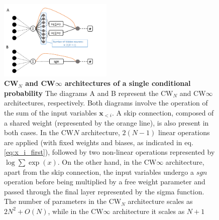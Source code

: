 \documentclass[aps,physrev,10pt,floatfix,reprint]{revtex4-2}
\begin{document}
\begin{figure}[!h]
    \centering 
    \includegraphics[width=0.48\textwidth]{img/CW_arch.pdf}
    \caption{\textbf{CW$_N$ and CW$\infty$ architectures of a single conditional probability} The diagrams A and B represent the CW$_N$ and CW$\infty$ architectures, respectively. Both diagrams involve the operation of the sum of the input variables $\mathbf{x}_{<i}$. A skip connection, composed of a shared weight (represented by the orange line), is also present in both cases. In the CW$N$ architecture, $2(N-1)$ linear operations are applied (with fixed weights and biases, as indicated in eq.\ref{eq:x_i_first}), followed by two non-linear operations represented by $\log \sum \exp(x)$. On the other hand, in the CW$\infty$ architecture, apart from the skip connection, the input variables undergo a $sgn$ operation before being multiplied by a free weight parameter and passed through the final layer represented by the sigma function. The number of parameters in the CW$_N$ architecture scales as $2N^2+O(N)$, while in the CW$\infty$ architecture it scales as $N+1$}
    \label{fig:CW_arch}
\end{figure}
\end{document}
